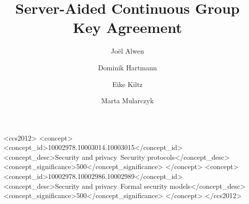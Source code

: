 \documentclass[sigconf]{acmart}
\begin{document}
\title{Server-Aided Continuous Group Key Agreement}

\author{Joël Alwen}
\author{Dominik Hartmann}
\author{Eike Kiltz}
\author{Marta Mularczyk}
\renewcommand{\shortauthors}{Alwen et al.}

\begin{abstract}

\end{abstract}

\begin{CCSXML}
<ccs2012>
   <concept>
       <concept_id>10002978.10003014.10003015</concept_id>
       <concept_desc>Security and privacy~Security protocols</concept_desc>
       <concept_significance>500</concept_significance>
       </concept>
   <concept>
       <concept_id>10002978.10002986.10002989</concept_id>
       <concept_desc>Security and privacy~Formal security models</concept_desc>
       <concept_significance>500</concept_significance>
       </concept>
 </ccs2012>
\end{CCSXML}



\maketitle




% 
% 






%


\end{document}
